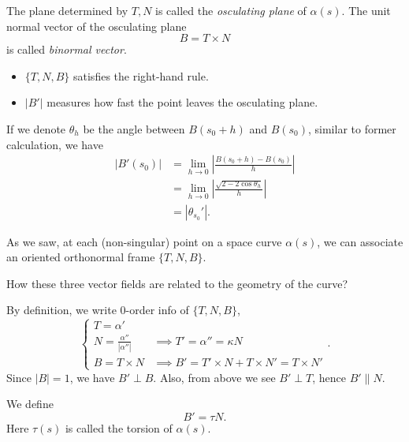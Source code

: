 \begin{definition}
The plane determined by \(T,N\) is called the \emph{osculating plane} of
\(\alpha(s)\). The unit normal vector of the osculating plane
\[
    B=T\times N
\] is called \emph{binormal vector}.
\end{definition}
\begin{remark}\hfill
\begin{itemize}
    \item \(\{T,N,B\}\) satisfies the right-hand rule.
    \item \(|B'|\) measures how fast the point leaves the osculating plane.
\end{itemize}
If we denote \(\theta_h\) be the angle between \(B(s_0+h)\) and \(B(s_0)\), similar to
former calculation, we have
\begin{align*}
    |B'(s_0)|&= \lim_{h \to 0} \left|\frac{B(s_0+h)-B(s_0)}{h}\right| \\
    &= \lim_{h \to 0} \left|\frac{\sqrt{2-2\cos\theta_h}}{h}\right| \\
    &= |\theta_{s_0}'|
.\end{align*}
\end{remark}

As we saw, at each (non-singular) point on a space curve \(\alpha(s)\), we can
associate an oriented orthonormal frame \(\{T,N,B\}\).
\begin{question}
    How these three vector fields are related to the geometry of the curve?
\end{question}
By definition, we write 0-order info of \(\{T,N,B\}\), \ie\ \[
    \begin{cases}
        T=\alpha' & \\
        N=\frac{\alpha''}{|\alpha''|} & \implies T'=\alpha''=\kappa N \\
        B=T\times N & \implies B'=T'\times N+T\times N'=T\times N'
    \end{cases}
.\] Since \(|B|=1\), we have \(B'\perp B\). Also, from above we see \(B'\perp T\),
hence \(B'\parallel N\).
\begin{definition}
    We define \[
        B'=\tau N
    .\] Here \(\tau(s)\) is called the torsion of \(\alpha(s)\).
\end{definition}

